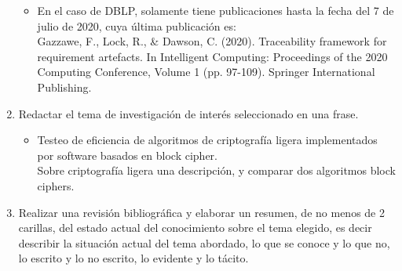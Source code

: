 \documentclass[]{article}
\begin{document}
\begin{enumerate}
\begin{itemize}
		\item En el caso de DBLP, solamente tiene publicaciones hasta la fecha del 7 de julio de 2020, cuya última publicación es: \\
		Gazzawe, F., Lock, R., \& Dawson, C. (2020). Traceability framework for requirement artefacts. In Intelligent Computing: Proceedings of the 2020 Computing Conference, Volume 1 (pp. 97-109). Springer International Publishing.
	\end{itemize}

	\item Redactar el tema de investigación de interés seleccionado en una frase. 
	\begin{itemize}
		\item Testeo de eficiencia de algoritmos de criptografía ligera implementados por software basados en block cipher. \\ Sobre criptografía ligera una descripción, y comparar dos algoritmos block ciphers.	
	\end{itemize}
	
	\item Realizar una revisión bibliográfica y elaborar un resumen, de no menos de 2 carillas, del estado actual del conocimiento sobre el tema elegido, es decir describir la situación actual del tema abordado, lo que se conoce y lo que no, lo escrito y lo no escrito, lo evidente y lo tácito.
\end{enumerate}
\printbibliography
\end{document}

